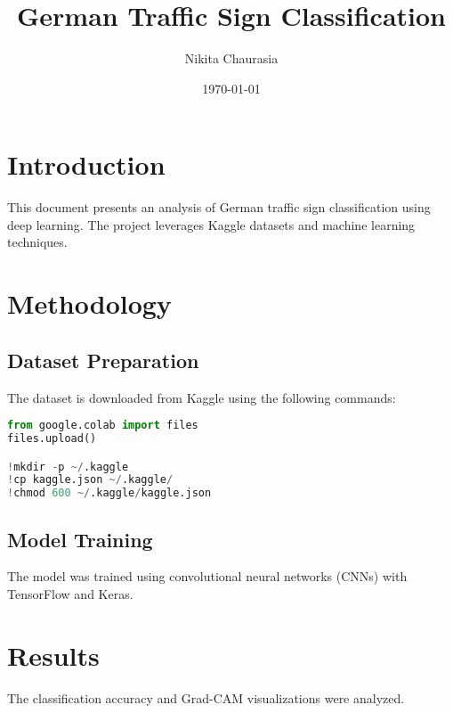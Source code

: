 \documentclass{article}
\title{German Traffic Sign Classification}
\author{Nikita Chaurasia}
\date{\today}
\begin{document}
\maketitle

\section{Introduction}
This document presents an analysis of German traffic sign classification using deep learning. The project leverages Kaggle datasets and machine learning techniques.

\section{Methodology}
\subsection{Dataset Preparation}
The dataset is downloaded from Kaggle using the following commands:

\begin{lstlisting}[language=Python, basicstyle=\ttfamily\footnotesize]
from google.colab import files
files.upload()

!mkdir -p ~/.kaggle
!cp kaggle.json ~/.kaggle/
!chmod 600 ~/.kaggle/kaggle.json
\end{lstlisting}

\subsection{Model Training}
The model was trained using convolutional neural networks (CNNs) with TensorFlow and Keras.

\section{Results}
The classification accuracy and Grad-CAM visualizations were analyzed.
\end{document}
